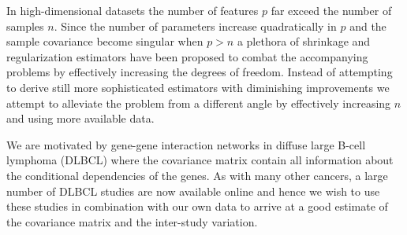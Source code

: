 \documentclass{article}\usepackage[]{graphicx}\usepackage[]{color}
\begin{document}
In high-dimensional datasets the number of features $p$ far exceed the number of samples $n$. Since the number of parameters increase quadratically in $p$ and the sample covariance become singular when $p > n$ a plethora of shrinkage and regularization estimators have been proposed to combat the accompanying problems by effectively increasing the degrees of freedom. Instead of attempting to derive still more sophisticated estimators with diminishing improvements we attempt to alleviate the problem from a different angle by effectively increasing $n$ and using more available data.

We are motivated by gene-gene interaction networks in diffuse large B-cell lymphoma (DLBCL) where the covariance matrix contain all information about the conditional dependencies of the genes. As with many other cancers, a large number of DLBCL studies are now available online and hence we wish to use these studies in combination with our own data to arrive at a good estimate of the covariance matrix and the inter-study variation.
\end{document}
